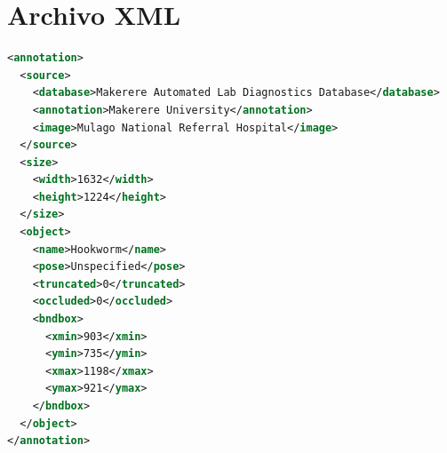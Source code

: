 \documentclass[letter,12pt]{report}
\begin{document}



\renewcommand{\refname}{Referencias}



\renewcommand{\appendixname}{Anexos}
\appendix

\chapter{Archivo XML}\label{xmlFormat}

\begin{lstlisting}[language=xml]
<annotation>
  <source>
    <database>Makerere Automated Lab Diagnostics Database</database>
    <annotation>Makerere University</annotation>
    <image>Mulago National Referral Hospital</image>
  </source>
  <size>
    <width>1632</width>
    <height>1224</height>
  </size>
  <object>
    <name>Hookworm</name>
    <pose>Unspecified</pose>
    <truncated>0</truncated>
    <occluded>0</occluded>
    <bndbox>
      <xmin>903</xmin>
      <ymin>735</ymin>
      <xmax>1198</xmax>
      <ymax>921</ymax>
    </bndbox>
  </object>
</annotation>
\end{lstlisting}
\end{document}
